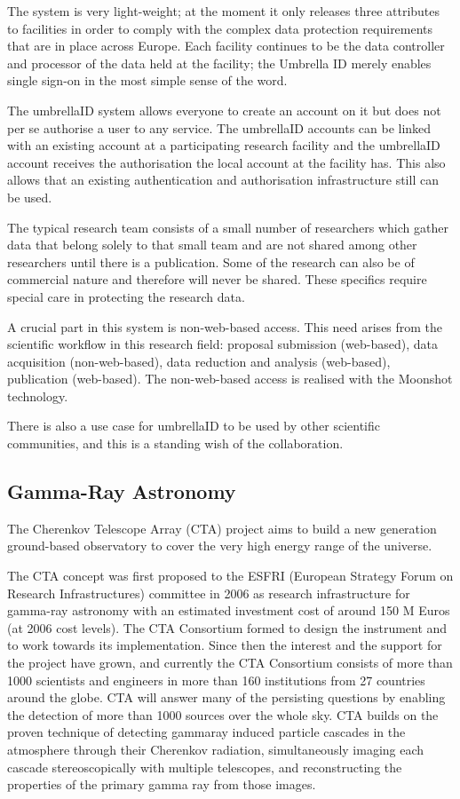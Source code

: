 \documentclass[fleqn,11pt]{wlscirep}
\begin{document}
{The system is very light-weight; at the moment it only releases three attributes to facilities in order to comply with the complex data protection requirements that are in place across Europe. Each facility continues to be the data controller and processor of the data held at the facility; the Umbrella ID merely enables single sign-on in the most simple sense of the word.
 
The umbrellaID system allows everyone to create an account on it but does not per se authorise a user to any service. The umbrellaID accounts can be linked with an existing account at a participating research facility and the umbrellaID account receives the authorisation the local account at the facility has. This also allows that an existing authentication and authorisation infrastructure still can be used.
 
The typical research team consists of a small number of researchers which gather data that belong solely to that small team and are not shared among other researchers until there is a publication. Some of the research can also be of commercial nature and therefore will never be shared. These specifics require special care in protecting the research data.
 
A crucial part in this system is non-web-based access. This need arises from the scientific workflow in this research field: proposal submission (web-based), data acquisition (non-web-based), data reduction and analysis (web-based), publication (web-based). The non-web-based access is realised with the Moonshot technology.

There is also a use case for umbrellaID to be used by other scientific communities, and this is a standing wish of the collaboration.

\subsection{Gamma-Ray Astronomy}
The Cherenkov Telescope Array (CTA) project aims to build a new generation ground-based observatory to cover the very high energy range of the universe.

The CTA concept was first proposed to the ESFRI (European Strategy Forum on Research Infrastructures) committee in 2006 as research infrastructure for gamma-ray astronomy with an estimated investment cost of around 150 M Euros (at 2006 cost levels). The CTA Consortium formed to design the instrument and to work towards its implementation. Since then the interest and the support for the project have grown, and currently the CTA Consortium consists of more than 1000 scientists and engineers in more than 160 institutions from 27 countries around the globe. CTA will answer many of the persisting questions by enabling the detection of more than 1000 sources over the whole sky. CTA builds on the proven technique of detecting gamma\-ray induced particle cascades in the atmosphere through their Cherenkov radiation, simultaneously imaging each cascade stereoscopically with multiple telescopes, and reconstructing the properties of the primary gamma ray from those images.\cite{cta-intro}
 
}
\end{document}
